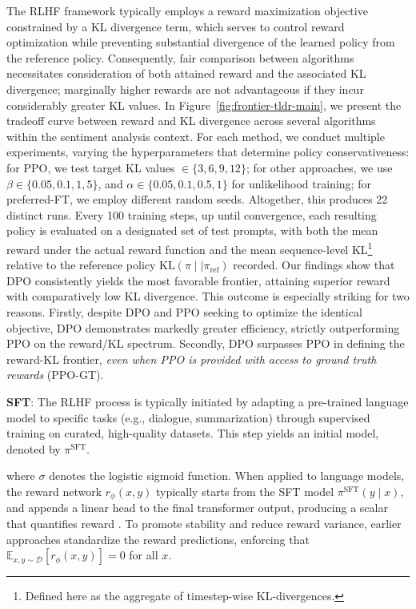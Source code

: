 The RLHF framework typically employs a reward maximization objective constrained by a KL divergence term, which serves to control reward optimization while preventing substantial divergence of the learned policy from the reference policy. Consequently, fair comparison between algorithms necessitates consideration of both attained reward and the associated KL divergence; marginally higher rewards are not advantageous if they incur considerably greater KL values. In Figure~\ref{fig:frontier-tldr-main}, we present the tradeoff curve between reward and KL divergence across several algorithms within the sentiment analysis context. For each method, we conduct multiple experiments, varying the hyperparameters that determine policy conservativeness: for PPO, we test target KL values $\in\{3,6,9,12\}$; for other approaches, we use $\beta \in \{0.05,0.1,1,5\}$, and $\alpha\in\{0.05,0.1,0.5,1\}$ for unlikelihood training; for preferred-FT, we employ different random seeds. Altogether, this produces 22 distinct runs. Every 100 training steps, up until convergence, each resulting policy is evaluated on a designated set of test prompts, with both the mean reward under the actual reward function and the mean sequence-level KL\footnote{Defined here as the aggregate of timestep-wise KL-divergences.} relative to the reference policy $\text{KL}\left(\pi\mid \mid \pi_\text{ref}\right)$ recorded. Our findings show that DPO consistently yields the most favorable frontier, attaining superior reward with comparatively low KL divergence. This outcome is especially striking for two reasons. Firstly, despite DPO and PPO seeking to optimize the identical objective, DPO demonstrates markedly greater efficiency, strictly outperforming PPO on the reward/KL spectrum. Secondly, DPO surpasses PPO in defining the reward-KL frontier, \emph{even when PPO is provided with access to ground truth rewards} (PPO-GT).

\textbf{SFT}: The RLHF process is typically initiated by adapting a pre-trained language model to specific tasks (e.g., dialogue, summarization) through supervised training on curated, high-quality datasets. This step yields an initial model, denoted by $\pi^\text{SFT}$.

where $\sigma$ denotes the logistic sigmoid function. When applied to language models, the reward network $r_{\phi}(x, y)$ typically starts from the SFT model $\pi^\text{SFT}(y \mid x)$, and appends a linear head to the final transformer output, producing a scalar that quantifies reward \cite{ziegler2020finetuning}. To promote stability and reduce reward variance, earlier approaches standardize the reward predictions, enforcing that $\mathbb{E}_{x,y\sim \mathcal{D}}\left[r_\phi(x, y)\right] = 0$ for all $x$.

